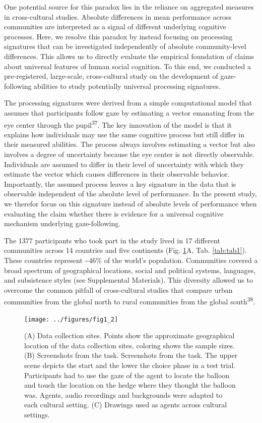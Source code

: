 \documentclass[
  man,floatsintext]{apa6}
\begin{document}
One potential source for this paradox lies in the reliance on aggregated measures in cross-cultural studies. Absolute differences in mean performance across communities are interpreted as a signal of different underlying cognitive processes. Here, we resolve this paradox by instead focusing on processing signatures that can be investigated independently of absolute community-level differences. This allows us to directly evaluate the empirical foundation of claims about universal features of human social cognition. To this end, we conducted a pre-registered, large-scale, cross-cultural study on the development of gaze-following abilities to study potentially universal processing signatures.

The processing signatures were derived from a simple computational model that assumes that participants follow gaze by estimating a vector emanating from the eye center through the pupil\textsuperscript{37}. The key innovation of the model is that it explains how individuals may use the same cognitive process but still differ in their measured abilities. The process always involves estimating a vector but also involves a degree of uncertainty because the eye center is not directly observable. Individuals are assumed to differ in their level of uncertainty with which they estimate the vector which causes differences in their observable behavior. Importantly, the assumed process leaves a key signature in the data that is observable independent of the absolute level of performance. In the present study, we therefor focus on this signature instead of absolute levels of performance when evaluating the claim whether there is evidence for a universal cognitive mechanism underlying gaze-following.

The 1377 participants who took part in the study lived in 17 different communities across 14 countries and five continents (Fig. \ref{fig:fig1}A, Tab. \ref{tab:tab1}). These countries represent \textasciitilde46\% of the world's population. Communities covered a broad spectrum of geographical locations, social and political systems, languages, and subsistence styles (see Supplemental Materials). This diversity allowed us to overcome the common pitfall of cross-cultural studies that compare urban communities from the global north to rural communities from the global south\textsuperscript{38}.

\begin{figure}

{\centering \texttt{[image: ../figures/fig1\_2]} 

}

\caption{(A) Data collection sites. Points show the approximate geographical location of the data collection sites, coloring shows the sample sizes. (B) Screenshots from the task. Screenshots from the task. The upper scene depicts the start and the lower the choice phase in a test trial. Participants had to use the gaze of the agent to locate the balloon and touch the location on the hedge where they thought the balloon was. Agents, audio recordings and backgrounds were adapted to each cultural setting. (C) Drawings used as agents across cultural settings.}\label{fig:fig1}
\end{figure}
\end{document}
